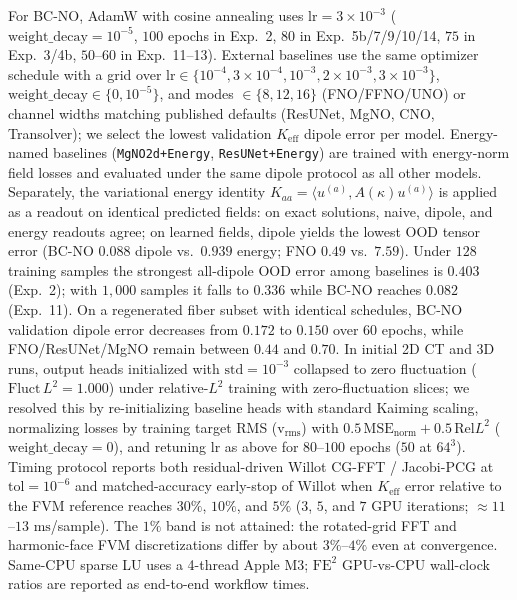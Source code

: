 \documentclass[preprint,11pt]{elsarticle}
\newcommand{\Keff}{K_{\mathrm{eff}}}
\begin{document}
For BC-NO, AdamW with cosine annealing uses $\mathrm{lr}=3\times 10^{-3}$ ($\mathrm{weight\_decay}=10^{-5}$, $100$ epochs in Exp.~2, $80$ in Exp.~5b/7/9/10/14, $75$ in Exp.~3/4b, $50$--$60$ in Exp.~11--13). External baselines use the same optimizer schedule with a grid over $\mathrm{lr}\in\{10^{-4},3\times 10^{-4},10^{-3},2\times 10^{-3},3\times 10^{-3}\}$, $\mathrm{weight\_decay}\in\{0,10^{-5}\}$, and modes $\in\{8,12,16\}$ (FNO/FFNO/UNO) or channel widths matching published defaults (ResUNet, MgNO, CNO, Transolver); we select the lowest validation $\Keff$ dipole error per model. Energy-named baselines (\texttt{MgNO2d+Energy}, \texttt{ResUNet+Energy}) are trained with energy-norm field losses and evaluated under the same dipole protocol as all other models. Separately, the variational energy identity $K_{aa}=\langle u^{(a)}, A(\kappa)u^{(a)}\rangle$ is applied as a readout on identical predicted fields: on exact solutions, naive, dipole, and energy readouts agree; on learned fields, dipole yields the lowest OOD tensor error (BC-NO $0.088$ dipole vs.\ $0.939$ energy; FNO $0.49$ vs.\ $7.59$). Under $128$ training samples the strongest all-dipole OOD error among baselines is $0.403$ (Exp.~2); with $1{,}000$ samples it falls to $0.336$ while BC-NO reaches $0.082$ (Exp.~11). On a regenerated fiber subset with identical schedules, BC-NO validation dipole error decreases from $0.172$ to $0.150$ over $60$ epochs, while FNO/ResUNet/MgNO remain between $0.44$ and $0.70$. In initial 2D CT and 3D runs, output heads initialized with $\mathrm{std}=10^{-3}$ collapsed to zero fluctuation ($\mathrm{Fluct}\,L^2 = 1.000$) under relative-$L^2$ training with zero-fluctuation slices; we resolved this by re-initializing baseline heads with standard Kaiming scaling, normalizing losses by training target RMS ($\mathrm{v}_{\mathrm{rms}}$) with $0.5\,\mathrm{MSE}_{\mathrm{norm}} + 0.5\,\mathrm{Rel}L^2$ ($\mathrm{weight\_decay}=0$), and retuning $\mathrm{lr}$ as above for $80$--$100$ epochs ($50$ at $64^3$). Timing protocol reports both residual-driven Willot CG-FFT / Jacobi-PCG at $\mathrm{tol}=10^{-6}$ and matched-accuracy early-stop of Willot when $\Keff$ error relative to the FVM reference reaches $30\%$, $10\%$, and $5\%$ ($3$, $5$, and $7$ GPU iterations; $\approx 11$--$13\text{ ms}$/sample). The $1\%$ band is not attained: the rotated-grid FFT and harmonic-face FVM discretizations differ by about $3\%$--$4\%$ even at convergence. Same-CPU sparse LU uses a 4-thread Apple M3; $\mathrm{FE}^2$ GPU-vs-CPU wall-clock ratios are reported as end-to-end workflow times.
\end{document}
